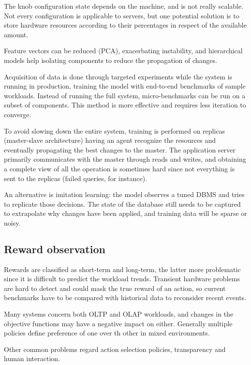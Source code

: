 The knob configuration state depends on the machine, and is not really scalable. Not every configuration is applicable to servers, but one potential solution is to store hardware resources according to their percentages in respect of the available amount. 

Feature vectors can be reduced (PCA), exacerbating instability, and hierarchical models help isolating components to reduce the propagation of changes. 

Acquisition of data is done through targeted experiments while the system is running in production, training the model with end-to-end benchmarks of sample workloads. Instead of running the full system, micro-benchmarks can be run on a subset of components. This method is more effective and requires less iteration to converge. 

To avoid slowing down the entire system, training is performed on replicas (master-slave architecture) having an agent recognize the resources and eventually propagating the best changes to the master. The application server primarily communicates with the master through reads and writes, and obtaining a complete view of all the operation is sometimes hard since not everything is sent to the replicas (failed queries, for instance). 

An alternative is imitation learning: the model observes a tuned DBMS and tries to replicate those decisions. The state of the database still needs to be captured to extrapolate why changes have been applied, and training data will be sparse or noisy.

\subsection{Reward observation}
Rewards are classified as short-term and long-term, the latter more problematic since it is difficult to predict the workload trends. Transient hardware problems are hard to detect and could mask the true reward of an action, so current benchmarks have to be compared with historical data to reconsider recent events. 

Many systems concern both OLTP and OLAP workloads, and changes in the objective functions may have a negative impact on either. Generally multiple policies define preference of one over th other in mixed environments. 

Other common problems regard action selection policies, transparency and human interaction. 
